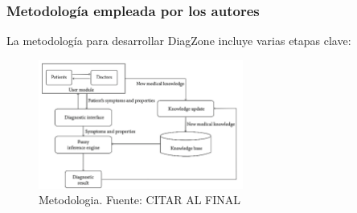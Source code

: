 \subsubsection{Metodología empleada por los autores}
La metodología para desarrollar DiagZone incluye varias etapas clave:

\begin{figure}[h]
	\begin{center}
		\includegraphics[width=0.6\textwidth]{2/1_antecedentes/Metodologia-9.png}
		\caption{Metodologia. Fuente: CITAR AL FINAL }
	\end{center}
\end{figure}

